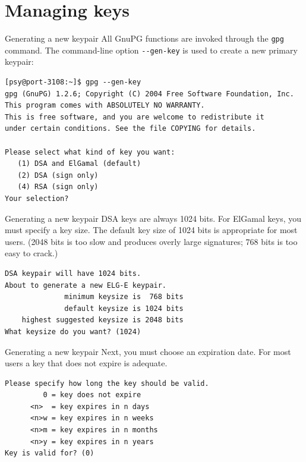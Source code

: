 \documentclass[%
mode=present,%
paper=smartboard,
size=20pt,
]{powerdot}
\newcommand{\clopt}[1]{\texttt{{-}#1}}
\begin{document}
\section{Managing keys}

\begin{slide}[method=direct]{Generating a new keypair}
  All GnuPG functions are invoked through the \texttt{gpg} command.
  The command-line option \clopt{-gen-key} is used to create a new
  primary keypair:\\[1ex]
\begin{verbatim}
[psy@port-3108:~]$ gpg --gen-key
gpg (GnuPG) 1.2.6; Copyright (C) 2004 Free Software Foundation, Inc.
This program comes with ABSOLUTELY NO WARRANTY.
This is free software, and you are welcome to redistribute it
under certain conditions. See the file COPYING for details.

Please select what kind of key you want:
   (1) DSA and ElGamal (default)
   (2) DSA (sign only)
   (4) RSA (sign only)
Your selection? 
\end{verbatim}
\end{slide}

\begin{slide}[method=direct,toc=]{Generating a new keypair}
  DSA keys are always 1024 bits.  For ElGamal keys, you must specify a
  key size.  The default key size of 1024 bits is appropriate for most
  users. (2048 bits is too slow and produces overly large
  signatures; 768 bits is too easy to crack.)\\[1ex]
\begin{verbatim}
DSA keypair will have 1024 bits.
About to generate a new ELG-E keypair.
              minimum keysize is  768 bits
              default keysize is 1024 bits
    highest suggested keysize is 2048 bits
What keysize do you want? (1024) 
\end{verbatim}
\end{slide}

\begin{slide}[method=direct,toc=]{Generating a new keypair}
  Next, you must choose an expiration date. For most users a key
  that does not expire is adequate.\\[1ex]
\begin{verbatim}
Please specify how long the key should be valid.
         0 = key does not expire
      <n>  = key expires in n days
      <n>w = key expires in n weeks
      <n>m = key expires in n months
      <n>y = key expires in n years
Key is valid for? (0)
\end{verbatim}
\end{slide}
\end{document}
